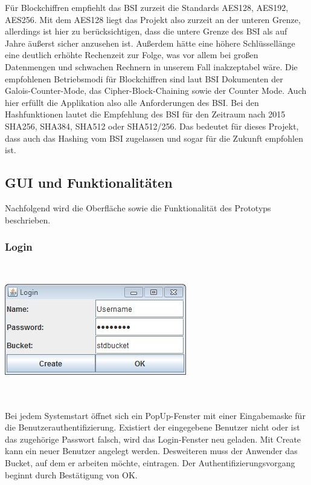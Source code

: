 \documentclass[13pt,a4paper,bibliography=totocnumbered,listof=totocnumbered]{scrartcl}
\begin{document}
Für Blockchiffren empfiehlt das BSI zurzeit die Standards AES128, AES192, AES256. Mit dem AES128 liegt das Projekt also zurzeit an der unteren Grenze, allerdings ist hier zu berücksichtigen, dass die untere Grenze des BSI als auf Jahre äußerst sicher anzusehen ist. Außerdem hätte eine höhere Schlüssellänge eine deutlich erhöhte Rechenzeit zur Folge, was vor allem bei großen Datenmengen und schwachen Rechnern in unserem Fall inakzeptabel wäre. Die empfohlenen Betriebsmodi für Blockchiffren sind laut BSI Dokumenten der Galois-Counter-Mode, das Cipher-Block-Chaining sowie der Counter Mode. Auch hier erfüllt die Applikation also alle Anforderungen des BSI. Bei den Hashfunktionen lautet die Empfehlung des BSI für den Zeitraum nach 2015 SHA256, SHA384, SHA512 oder SHA512/256. Das bedeutet für dieses Projekt, dass auch das Hashing vom BSI zugelassen und sogar für die Zukunft empfohlen ist. \cite{12}\cite{13}

\subsection{GUI und Funktionalitäten}\label{GUIV}
Nachfolgend wird die Oberfläche sowie die Funktionalität des Prototyps beschrieben.

\subsubsection{Login}
$\;$\\
\begin{minipage}{\linewidth}
	\centering
	\includegraphics[width=0.4\linewidth]{./img/Login.jpg}
	\label{Login}
\end{minipage}
\\\\Bei jedem Systemstart öffnet sich ein PopUp-Fenster mit einer Eingabemaske für die Benutzerauthentifizierung. Existiert der eingegebene Benutzer nicht oder ist das zugehörige Passwort falsch, wird das Login-Fenster neu geladen. Mit Create kann ein neuer Benutzer angelegt werden. Desweiteren muss der Anwender das Bucket, auf dem er arbeiten möchte, eintragen. Der Authentifizierungsvorgang beginnt durch Bestätigung von OK.
\end{document}
